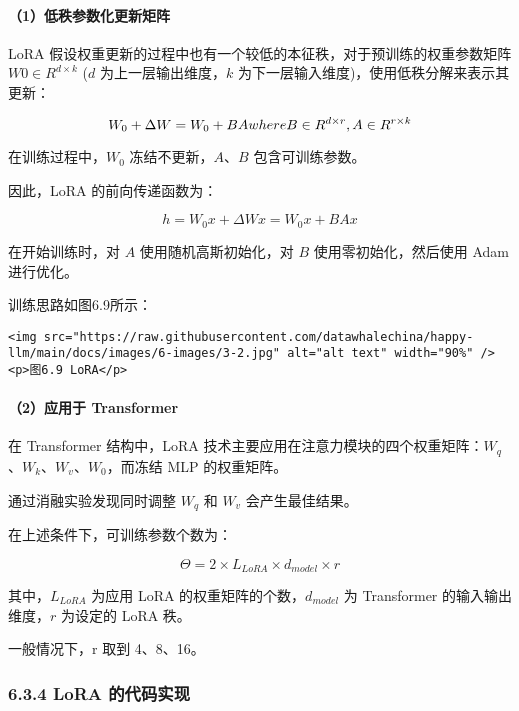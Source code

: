 \documentclass[
]{article}
\begin{document}
\paragraph{（1）低秩参数化更新矩阵}\label{ux4f4eux79e9ux53c2ux6570ux5316ux66f4ux65b0ux77e9ux9635}

LoRA 假设权重更新的过程中也有一个较低的本征秩，对于预训练的权重参数矩阵
\(W0 \in R^{d \times k}\) (\(d\) 为上一层输出维度，\(k\)
为下一层输入维度)，使用低秩分解来表示其更新：

\[W_0 + {\Delta}W = W_0 + BA \space\space  where \space B \in R^{d \times r}, A \in R^{r \times k}\]

在训练过程中，\(W_0\) 冻结不更新，\(A\)、\(B\) 包含可训练参数。

因此，LoRA 的前向传递函数为：

\[h = W_0 x + \Delta W x = W_0 x + B A x\]

在开始训练时，对 \(A\) 使用随机高斯初始化，对 \(B\)
使用零初始化，然后使用 Adam 进行优化。

训练思路如图6.9所示：

\begin{verbatim}
<img src="https://raw.githubusercontent.com/datawhalechina/happy-llm/main/docs/images/6-images/3-2.jpg" alt="alt text" width="90%" />
<p>图6.9 LoRA</p>
\end{verbatim}

\paragraph{（2）应用于
Transformer}\label{ux5e94ux7528ux4e8e-transformer}

在 Transformer 结构中，LoRA
技术主要应用在注意力模块的四个权重矩阵：\(W_q\)、\(W_k\)、\(W_v\)、\(W_0\)，而冻结
MLP 的权重矩阵。

通过消融实验发现同时调整 \(W_q\) 和 \(W_v\) 会产生最佳结果。

在上述条件下，可训练参数个数为：

\[\Theta = 2 \times L_{LoRA} \times d_{model} \times r\]

其中，\(L_{LoRA}\) 为应用 LoRA 的权重矩阵的个数，\(d_{model}\) 为
Transformer 的输入输出维度，\(r\) 为设定的 LoRA 秩。

一般情况下，r 取到 4、8、16。

\subsubsection{6.3.4 LoRA
的代码实现}\label{lora-ux7684ux4ee3ux7801ux5b9eux73b0}
\end{document}
